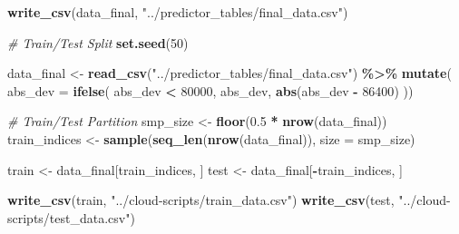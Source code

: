 \documentclass[
  12pt,
]{article}
\newenvironment{Shaded}{\begin{snugshade}}{\end{snugshade}}
\newcommand{\AttributeTok}[1]{\textcolor[rgb]{0.13,0.29,0.53}{#1}}
\newcommand{\CommentTok}[1]{\textcolor[rgb]{0.56,0.35,0.01}{\textit{#1}}}
\newcommand{\DecValTok}[1]{\textcolor[rgb]{0.00,0.00,0.81}{#1}}
\newcommand{\FloatTok}[1]{\textcolor[rgb]{0.00,0.00,0.81}{#1}}
\newcommand{\FunctionTok}[1]{\textcolor[rgb]{0.13,0.29,0.53}{\textbf{#1}}}
\newcommand{\NormalTok}[1]{#1}
\newcommand{\OtherTok}[1]{\textcolor[rgb]{0.56,0.35,0.01}{#1}}
\newcommand{\SpecialCharTok}[1]{\textcolor[rgb]{0.81,0.36,0.00}{\textbf{#1}}}
\newcommand{\StringTok}[1]{\textcolor[rgb]{0.31,0.60,0.02}{#1}}
\begin{document}
\begin{Shaded}
\begin{Highlighting}[]
\FunctionTok{write\_csv}\NormalTok{(data\_final, }\StringTok{"../predictor\_tables/final\_data.csv"}\NormalTok{)}
\end{Highlighting}
\end{Shaded}

\begin{Shaded}
\begin{Highlighting}[]
\CommentTok{\# Train/Test Split}
\FunctionTok{set.seed}\NormalTok{(}\DecValTok{50}\NormalTok{)}

\NormalTok{data\_final }\OtherTok{\textless{}{-}} \FunctionTok{read\_csv}\NormalTok{(}\StringTok{"../predictor\_tables/final\_data.csv"}\NormalTok{) }\SpecialCharTok{\%\textgreater{}\%}
  \FunctionTok{mutate}\NormalTok{(}
    \AttributeTok{abs\_dev =} \FunctionTok{ifelse}\NormalTok{(}
\NormalTok{    abs\_dev }\SpecialCharTok{\textless{}} \DecValTok{80000}\NormalTok{, abs\_dev,}
    \FunctionTok{abs}\NormalTok{(abs\_dev }\SpecialCharTok{{-}} \DecValTok{86400}\NormalTok{)}
\NormalTok{    ))}

\CommentTok{\# Train/Test Partition}
\NormalTok{smp\_size }\OtherTok{\textless{}{-}} \FunctionTok{floor}\NormalTok{(}\FloatTok{0.5} \SpecialCharTok{*} \FunctionTok{nrow}\NormalTok{(data\_final))}
\NormalTok{train\_indices }\OtherTok{\textless{}{-}} \FunctionTok{sample}\NormalTok{(}\FunctionTok{seq\_len}\NormalTok{(}\FunctionTok{nrow}\NormalTok{(data\_final)), }\AttributeTok{size =}\NormalTok{ smp\_size)}

\NormalTok{train }\OtherTok{\textless{}{-}}\NormalTok{ data\_final[train\_indices, ]}
\NormalTok{test }\OtherTok{\textless{}{-}}\NormalTok{ data\_final[}\SpecialCharTok{{-}}\NormalTok{train\_indices, ]}

\FunctionTok{write\_csv}\NormalTok{(train, }\StringTok{"../cloud{-}scripts/train\_data.csv"}\NormalTok{)}
\FunctionTok{write\_csv}\NormalTok{(test, }\StringTok{"../cloud{-}scripts/test\_data.csv"}\NormalTok{)}
\end{Highlighting}
\end{Shaded}
\end{document}
